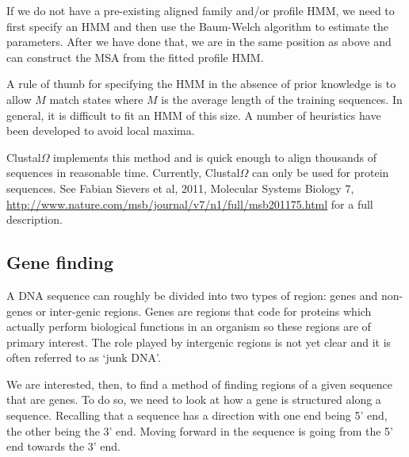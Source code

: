 \documentclass[11pt]{article}
\begin{document}
If we do not have a pre-existing aligned family and/or profile HMM, we need to first specify an HMM and then use the Baum-Welch algorithm to estimate the parameters.  After we have done that, we are in the same position as above and can construct the MSA from the fitted profile HMM.   

A rule of thumb for specifying the HMM in the absence of prior knowledge is to allow $M$ match states where $M$ is the average length of the training sequences.  
In general, it is difficult  to fit an HMM of this size.  A number of heuristics have been developed to avoid local maxima.  

Clustal$\Omega$  implements this method and is quick enough to align thousands of sequences in reasonable time.  Currently, Clustal$\Omega$ can only be used for protein sequences. See Fabian Sievers et al, 2011, Molecular Systems Biology 7, \url{http://www.nature.com/msb/journal/v7/n1/full/msb201175.html} for a full description.


\subsection{Gene finding}

A DNA sequence can roughly be divided into two types of region: genes and non-genes or inter-genic regions.  Genes are regions that code for proteins which actually perform biological functions in an organism so these regions  are of primary interest.  The role played by  intergenic regions is not yet clear and it is often referred to as `junk DNA'.

We are interested, then, to find a method of finding regions of a given sequence that are genes.  To do so, we need to look at how a gene is structured along a sequence.    Recalling that a sequence has a direction with one end being  5' end, the other being the  3' end. Moving forward in the sequence is going from the 5' end towards the 3' end.  
\end{document}
